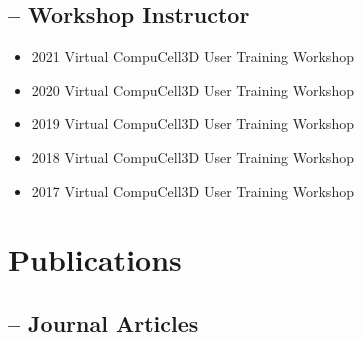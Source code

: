 \subsection*{-- Workshop Instructor}
\begin{itemize}\setlength\itemsep{-.9em}
    \item 2021 Virtual CompuCell3D User Training Workshop
    \item 2020 Virtual CompuCell3D User Training Workshop
    \item 2019 Virtual CompuCell3D User Training Workshop
    \item 2018 Virtual CompuCell3D User Training Workshop
    \item 2017 Virtual CompuCell3D User Training Workshop
\end{itemize}

\section*{  Publications}
\subsection*{-- Journal Articles}

